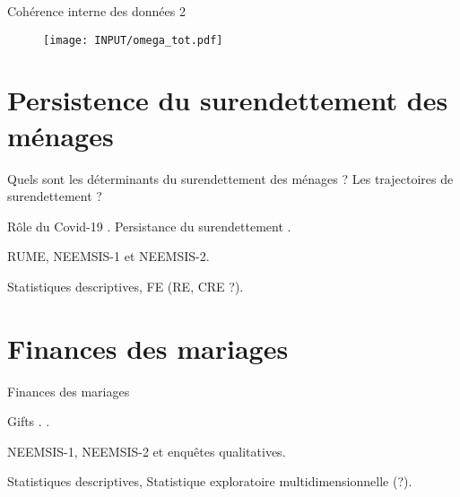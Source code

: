 \documentclass[aspectratio=169]{beamer}
\begin{document}
\begin{frame}[plain, shrink=2]{Cohérence interne des données 2}
\begin{figure}[htpb]
\centering
\texttt{[image: INPUT/omega\_tot.pdf]}
\end{figure}
 \end{frame}








\section{Persistence du surendettement des ménages}
\begin{frame}{Quels sont les déterminants du surendettement des ménages ? Les trajectoires de surendettement ?}
    \begin{vfilleditems}
        \item[\faBook] Rôle du Covid-19 \citep{Guerin2021}. Persistance du surendettement \citep{Chichaibelu2018}.
        \item[\faDatabase] RUME, NEEMSIS-1 et NEEMSIS-2.
		\item[\faIndustry] Statistiques descriptives, FE (RE, CRE ?).
    \end{vfilleditems}
\end{frame}







\section{Finances des mariages}
\begin{frame}{Finances des mariages}
    \begin{vfilleditems}
        \item[\faBook] Gifts \citep{Bloch2004}.  \citep{Guerin2020c}.
        \item[\faDatabase] NEEMSIS-1, NEEMSIS-2 et enquêtes qualitatives.
		\item[\faIndustry] Statistiques descriptives, Statistique exploratoire multidimensionnelle (?). 
    \end{vfilleditems}
\end{frame}
\end{document}
